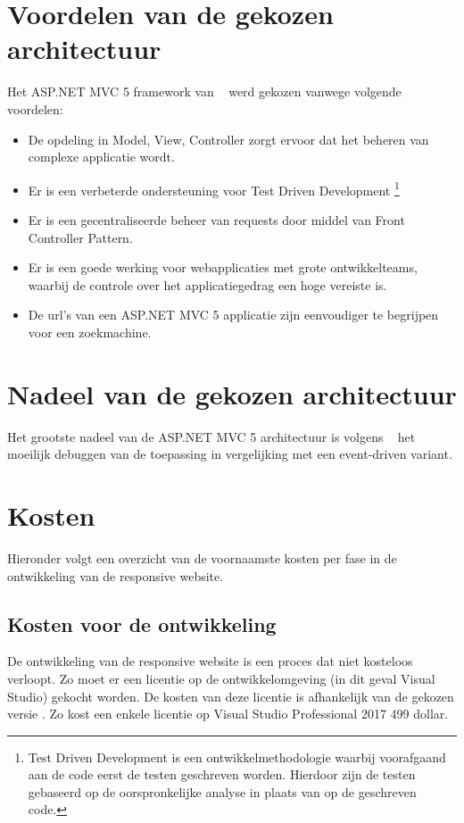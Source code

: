 \section{Voordelen van de gekozen architectuur}
Het ASP.NET MVC 5 framework van ~\cite{aspnetmvcoverview2017} werd gekozen vanwege volgende voordelen:
\begin{itemize}
  \item De opdeling in Model, View, Controller zorgt ervoor dat het beheren van complexe applicatie wordt.
  \item Er is een verbeterde ondersteuning voor Test Driven Development \footnote{Test Driven Development is een ontwikkelmethodologie waarbij voorafgaand aan de code eerst de testen geschreven worden. Hierdoor zijn de testen gebaseerd op de oorspronkelijke analyse in plaats van op de geschreven code.}
  \item Er is een gecentraliseerde beheer van requests door middel van Front Controller Pattern.
  \item Er is een goede werking voor webapplicaties met grote ontwikkelteams, waarbij de controle over het applicatiegedrag een hoge vereiste is.
  \item De url's van een ASP.NET MVC 5 applicatie zijn eenvoudiger te begrijpen voor een zoekmachine.
\end{itemize}

\section{Nadeel van de gekozen architectuur}
Het grootste nadeel van de ASP.NET MVC 5 architectuur is volgens ~\cite{hasaspnetcorekilledwebforms2017} het moeilijk debuggen van de toepassing in vergelijking met een event-driven variant.

\section{Kosten}
Hieronder volgt een overzicht van de voornaamste kosten per fase in de ontwikkeling van de responsive website.
\subsection{Kosten voor de ontwikkeling}
De ontwikkeling van de responsive website is een proces dat niet kosteloos verloopt. Zo moet er een licentie op de ontwikkelomgeving (in dit geval Visual Studio) gekocht worden.
De kosten van deze licentie is afhankelijk van de gekozen versie \citep{pricingandpurchingoptionsvisualstudio2017}. Zo kost een enkele licentie op Visual Studio Professional 2017 499 dollar.

